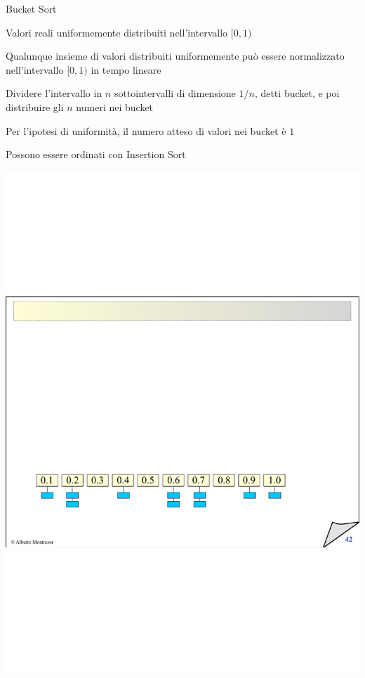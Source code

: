 \begin{frame}[shrink]{Bucket Sort}

\vspace{-9pt}
\begin{myboxtitle}
\BI
\item Valori reali uniformemente distribuiti nell'intervallo $[0, 1)$
\item Qualunque insieme di valori distribuiti uniformemente può essere normalizzato nell'intervallo $[0, 1)$ in tempo lineare
\EI
\end{myboxtitle}

\begin{myboxtitle}[Idea]
\BI
\item Dividere l'intervallo in $n$ sottointervalli di dimensione $1/n$, detti \alert{bucket}, e poi distribuire gli $n$ numeri nei bucket
\item Per l'ipotesi di uniformità, il numero atteso di valori nei bucket è $1$
\item Possono essere ordinati con Insertion Sort
\EI
\end{myboxtitle}

\bigskip
\includegraphics[width=\textwidth]{bucket.pdf}	

\end{frame}%


